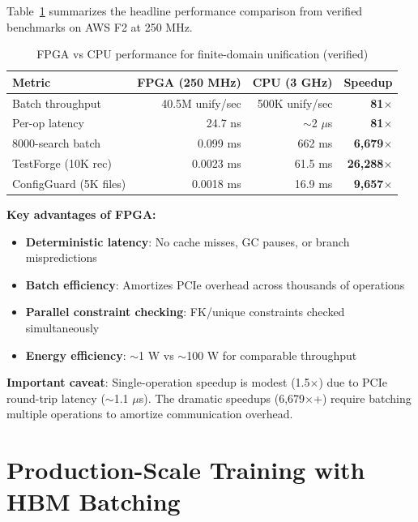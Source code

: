 \documentclass[11pt,a4paper]{article}
\begin{document}
Table~\ref{tab:comparison_chirho} summarizes the headline performance comparison
from verified benchmarks on AWS F2 at 250 MHz.

\begin{table}[ht]
\centering
\caption{FPGA vs CPU performance for finite-domain unification (verified)}
\label{tab:comparison_chirho}
\begin{tabular}{lrrr}
\toprule
\textbf{Metric} & \textbf{FPGA (250 MHz)} & \textbf{CPU (3 GHz)} & \textbf{Speedup} \\
\midrule
Batch throughput & 40.5M unify/sec & 500K unify/sec & \textbf{81$\times$} \\
Per-op latency & 24.7 ns & $\sim$2 $\mu$s & \textbf{81$\times$} \\
8000-search batch & 0.099 ms & 662 ms & \textbf{6,679$\times$} \\
TestForge (10K rec) & 0.0023 ms & 61.5 ms & \textbf{26,288$\times$} \\
ConfigGuard (5K files) & 0.0018 ms & 16.9 ms & \textbf{9,657$\times$} \\
\bottomrule
\end{tabular}
\end{table}

\textbf{Key advantages of FPGA:}
\begin{itemize}
  \item \textbf{Deterministic latency}: No cache misses, GC pauses, or branch mispredictions
  \item \textbf{Batch efficiency}: Amortizes PCIe overhead across thousands of operations
  \item \textbf{Parallel constraint checking}: FK/unique constraints checked simultaneously
  \item \textbf{Energy efficiency}: $\sim$1 W vs $\sim$100 W for comparable throughput
\end{itemize}

\textbf{Important caveat}: Single-operation speedup is modest (1.5$\times$) due to
PCIe round-trip latency ($\sim$1.1 $\mu$s). The dramatic speedups (6,679$\times$+)
require batching multiple operations to amortize communication overhead.

\section{Production-Scale Training with HBM Batching}
\label{sec:production_scale_chirho}
\end{document}
